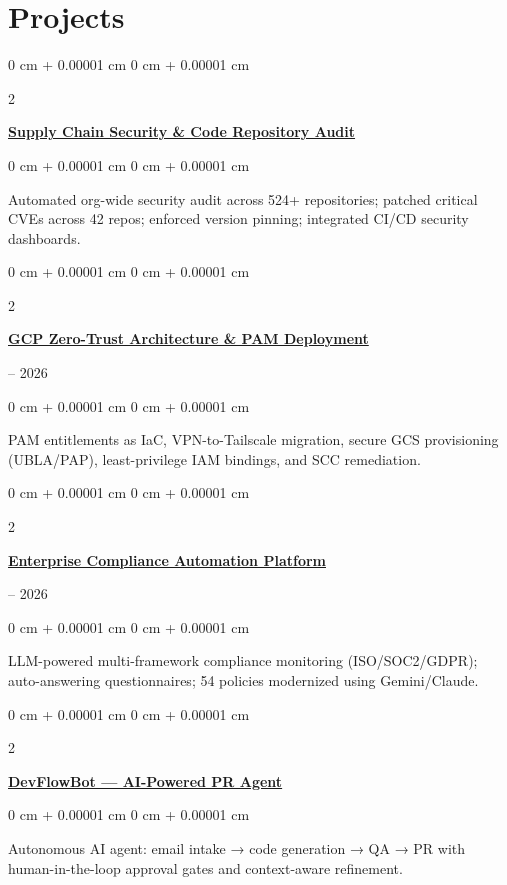 \documentclass[10pt, letterpaper]{article}
\newenvironment{onecolentry}{
    \begin{adjustwidth}{
        0 cm + 0.00001 cm
    }{
        0 cm + 0.00001 cm
    }
}{
    \end{adjustwidth}
}
\newenvironment{twocolentry}[2][]{
    \onecolentry
    \def\secondColumn{#2}
    \setcolumnwidth{\fill, 4.5 cm}
    \begin{paracol}{2}
}{
    \switchcolumn \raggedleft \secondColumn
    \end{paracol}
    \endonecolentry
}
\begin{document}
\section{Projects}
\vspace{0.10 cm}

\vspace{0.2 cm}

\begin{twocolentry}{2026}
    \textbf{\href{https://github.com/chinmay-dhok/Supply-Chain-Security-Hardening}{Supply Chain Security \& Code Repository Audit}}
\end{twocolentry}
\vspace{0.10 cm}
\begin{onecolentry}
    Automated org-wide security audit across 524+ repositories; patched critical CVEs across 42 repos; enforced version pinning; integrated CI/CD security dashboards.
\end{onecolentry}

\vspace{0.2 cm}

\begin{twocolentry}{2025 -- 2026}
    \textbf{\href{https://github.com/chinmay-dhok/GCP-Zero-Trust-Architecture}{GCP Zero-Trust Architecture \& PAM Deployment}}
\end{twocolentry}
\vspace{0.10 cm}
\begin{onecolentry}
    PAM entitlements as IaC, VPN-to-Tailscale migration, secure GCS provisioning (UBLA/PAP), least-privilege IAM bindings, and SCC remediation.
\end{onecolentry}

\vspace{0.2 cm}

\begin{twocolentry}{2025 -- 2026}
    \textbf{\href{https://github.com/chinmay-dhok/Automated-Compliance-Auditor}{Enterprise Compliance Automation Platform}}
\end{twocolentry}
\vspace{0.10 cm}
\begin{onecolentry}
    LLM-powered multi-framework compliance monitoring (ISO/SOC2/GDPR); auto-answering questionnaires; 54 policies modernized using Gemini/Claude.
\end{onecolentry}

\vspace{0.2 cm}

\begin{twocolentry}{2025}
    \textbf{\href{https://github.com/chinmay-dhok/DevFlowBot-Gemini-3-Pro-GitHubPR}{DevFlowBot — AI-Powered PR Agent}}
\end{twocolentry}
\vspace{0.10 cm}
\begin{onecolentry}
    Autonomous AI agent: email intake → code generation → QA → PR with human-in-the-loop approval gates and context-aware refinement.
\end{onecolentry}
\end{document}
